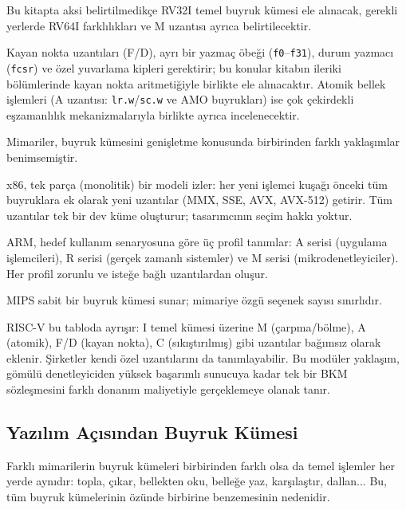 Bu kitapta aksi belirtilmedikçe RV32I temel buyruk kümesi ele alınacak, gerekli yerlerde RV64I farklılıkları ve M uzantısı ayrıca belirtilecektir.

\begin{bilginot}
Kayan nokta uzantıları (F/D), ayrı bir yazmaç öbeği (\texttt{f0}--\texttt{f31}), durum yazmacı (\texttt{fcsr}) ve özel yuvarlama kipleri gerektirir; bu konular kitabın ileriki bölümlerinde kayan nokta aritmetiğiyle birlikte ele alınacaktır. Atomik bellek işlemleri (A uzantısı: \texttt{lr.w}/\texttt{sc.w} ve AMO buyrukları) ise çok çekirdekli eşzamanlılık mekanizmalarıyla birlikte ayrıca incelenecektir.
\end{bilginot}

\begin{karsilastirma}
Mimariler, buyruk kümesini genişletme konusunda birbirinden farklı yaklaşımlar benimsemiştir.

x86, tek parça (monolitik) bir modeli izler: her yeni işlemci kuşağı önceki tüm buyruklara ek olarak yeni uzantılar (MMX, SSE, AVX, AVX-512) getirir. Tüm uzantılar tek bir dev küme oluşturur; tasarımcının seçim hakkı yoktur.

ARM, hedef kullanım senaryosuna göre üç profil tanımlar: A serisi (uygulama işlemcileri), R serisi (gerçek zamanlı sistemler) ve M serisi (mikrodenetleyiciler). Her profil zorunlu ve isteğe bağlı uzantılardan oluşur.

MIPS sabit bir buyruk kümesi sunar; mimariye özgü seçenek sayısı sınırlıdır.

RISC-V bu tabloda ayrışır: I temel kümesi üzerine M (çarpma/bölme), A (atomik), F/D (kayan nokta), C (sıkıştırılmış) gibi uzantılar bağımsız olarak eklenir. Şirketler kendi özel uzantılarını da tanımlayabilir. Bu modüler yaklaşım, gömülü denetleyiciden yüksek başarımlı sunucuya kadar tek bir BKM sözleşmesini farklı donanım maliyetiyle gerçeklemeye olanak tanır.
\end{karsilastirma}


\subsection{Yazılım Açısından Buyruk Kümesi}

Farklı mimarilerin buyruk kümeleri birbirinden farklı olsa da temel işlemler her yerde aynıdır: topla, çıkar, bellekten oku, belleğe yaz, karşılaştır, dallan... Bu, tüm buyruk kümelerinin özünde birbirine benzemesinin nedenidir.

